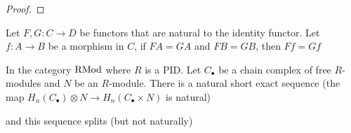 \begin{proof}
\end{proof}

\begin{lemma}
	Let $F, G: C \to D$ be functors that are natural to the identity functor. Let $f: A \to B$ be a morphism in $C$, if $FA = GA$ and $FB = GB$, then $Ff = Gf$
	
	\begin{center}
	\end{center}
\end{lemma}

\begin{theorem}
	In the category $\operatorname{RMod}$ where $R$ is a PID. Let $C_\bullet$ be a chain complex of free $R$-modules and $N$ be an $R$-module. There is a natural short exact sequence (the map $H_n(C_\bullet) \otimes N \to H_n(C_\bullet \times N)$ is natural)
	\begin{center}
	\end{center}
	
	and this sequence splits (but not naturally)
\end{theorem}

